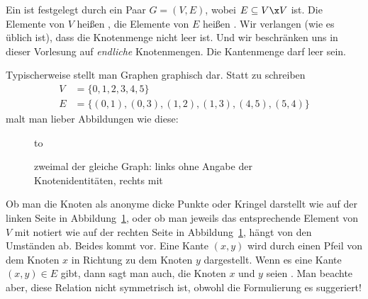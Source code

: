 Ein %
 ist festgelegt durch ein Paar $G=(V,E)$,
wobei $E\subseteq V\x V$ ist.
% 
Die Elemente von $V$ heißen , die Elemente von $E$
heißen . Wir verlangen (wie es üblich ist), dass die
Knotenmenge nicht leer ist.
% 
Und wir beschränken uns in dieser Vorlesung auf \emph{endliche}
Knotenmengen. Die Kantenmenge darf leer sein.

Typischerweise stellt man Graphen graphisch dar.
% 
Statt zu schreiben
% 
\begin{align*} V &= \{ 0,1,2,3,4,5 \} \\ E &= \{ (0,1), (0,3), (1,2),
(1,3), (4,5), (5,4) \}
\end{align*}
% 
malt man lieber Abbildungen wie diese:
% 
\begin{figure}[ht] \hbox to 
  \caption{zweimal der gleiche Graph: links ohne Angabe der
Knotenidentitäten, rechts mit}
  \label{abb:graph-ohne-mit}
\end{figure}

\noindent Ob man die Knoten als anonyme dicke Punkte oder Kringel
darstellt wie auf der linken Seite in
Abbildung~\ref{abb:graph-ohne-mit}, oder ob man jeweils das
entsprechende Element von $V$ mit notiert wie auf der rechten Seite in
Abbildung~\ref{abb:graph-ohne-mit}, hängt von den Umständen ab. Beides
kommt vor.
% 
Eine Kante $(x,y)$ wird durch einen Pfeil von dem Knoten $x$ in
Richtung zu dem Knoten $y$ dargestellt.
% 
Wenn es eine Kante $(x,y)\in E$ gibt, dann sagt man auch, die Knoten
$x$ und $y$ seien .
% 
Man beachte aber, diese Relation nicht symmetrisch ist, obwohl die
Formulierung es suggeriert! %

